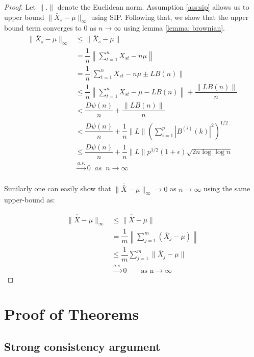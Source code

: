 \documentclass[12pt]{article}
\begin{document}
\begin{proof}
Let $\|.\|$ denote the Euclidean norm. Assumption \ref{ass:sip} allows us to upper bound $\|\bar{X}_s - \mu\|_{\infty}$ using SIP. Following that, we show that the upper bound term converges to 0 as $n \to \infty$ using lemma \ref{lemma: brownian}.
 \begin{align*}
    \|\overline{X}_s - \mu\|_{\infty} & \leq \|\overline{X}_s - \mu\| \\
    &= \dfrac{1}{n}\left\|\sum_{t=1}^{n}X_{st} - n\mu\right\|\\
    &= \dfrac{1}{n}|\sum_{t=1}^{n}X_{st} - n\mu \pm L B(n)\|\\
    & \leq \dfrac{1}{n}\left\|\sum_{t=1}^{n}X_{st} - \mu - L B(n)\right\| + \dfrac{\left\|L B(n)\right\|}{n}\\
    &< \dfrac{D\psi(n)}{n} + \dfrac{\|L B(n)\|}{n}\\
    &< \dfrac{D\psi(n)}{n} + \dfrac{1}{n}\|L\| \left(\sum\limits_{i=1}^{p}|B^{(i)}(k)|^2\right)^{1/2}\\
    & \leq \dfrac{D\psi(n)}{n} + \dfrac{1}{n}\|L\| p^{1/2}(1+\epsilon)\sqrt{2n \log\log n}\\
    & \xrightarrow[]{a.s.} 0\;\; as \;\; n\to \infty
 \end{align*}

  Similarly one can easily show that $\|\bar{\bar{X}} - \mu\|_{\infty} \to 0$ as $n \to \infty$ using the same upper-bound as:
 
 \begin{align*}
    \|\overline{\overline{X}} - \mu\|_{\infty} & \leq \|\overline{\overline{X}} - \mu\|\\
    &= \dfrac{1}{m}\left\|\sum_{j=1}^{m}(\overline{X}_j- \mu) \right\|\\
    & \leq \dfrac{1}{m}\sum_{j=1}^{m}\|\overline{X}_j - \mu\|\\
    & \xrightarrow{a.s.} 0\qquad \textrm{as n} \to \infty 
\end{align*}
\end{proof}


\section{Proof of Theorems} \label{appendix:A}

\subsection{Strong consistency argument} \label{appendix:strong_consis}
\end{document}

